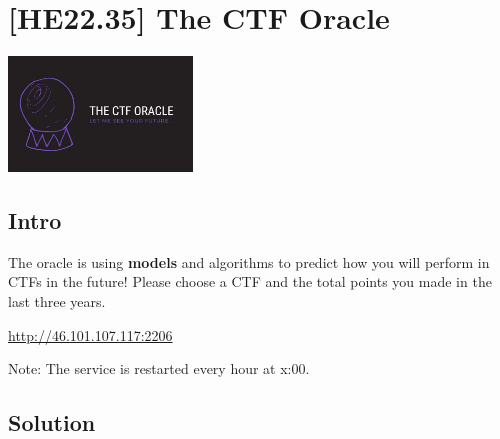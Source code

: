 
\hypertarget{he22.35}{%
\chapter{%
	\texorpdfstring{[HE22.35] The CTF Oracle {\NotoEmoji🔮}}%
		{[HE22.35] The CTF Oracle}}\label{he22.35}}

\begin{marginfigure}
	\includegraphics[width=49mm]{level8/challenge35.jpg}
\end{marginfigure}
\section{Intro}
The oracle is using \textbf{models} and algorithms to predict how you will
perform in CTFs in the future! Please choose a CTF and the total points you
made in the last three years.

\noindent \url{http://46.101.107.117:2206}

\noindent Note: The service is restarted every hour at x:00.

\section{Solution}\label{hv22.35solution}

